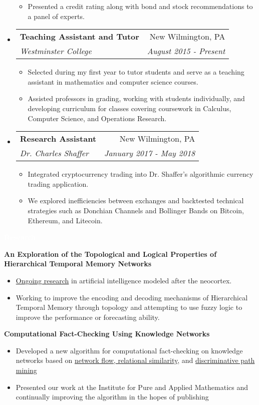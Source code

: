 \documentclass[letterpaper,11pt]{article}
\makeatletter
\newcommand{\resitem}[1]{\item #1 \vspace{-2pt}}
\newcommand{\resheading}[1]{{\large \colorbox{mypurple}{\begin{minipage}{\textwidth}{\textbf{#1 \vphantom{p\^{E}}}}\end{minipage}}}}
\newcommand{\ressubheading}[4]{
	\begin{tabular*}{7.0in}{l@{\extracolsep{\fill}}r}
		\textbf{#1} & #2 \\
		\textit{#3} & \textit{#4} \\
	\end{tabular*}\vspace{-6pt}}
\makeatother
\begin{document}
\begin{itemize}
\begin{itemize}
			\resitem{Presented a credit rating along with bond and stock recommendations to a panel of experts.}
		\end{itemize}	
	\item
		\ressubheading{Teaching Assistant and Tutor}{New Wilmington, PA}{Westminster College}{August 2015 - Present}
		\begin{itemize}
			\resitem{Selected during my first year to tutor students and serve as a teaching assistant in mathematics and computer science courses.}
			\resitem{Assisted professors in grading, working with students individually, and developing curriculum for classes covering coursework in Calculus, Computer Science, and Operations Research.}
		\end{itemize}
		
		\item
		\ressubheading{Research Assistant}{New Wilmington, PA}{Dr. Charles Shaffer}{January 2017 - May 2018}
		\begin{itemize}
			\resitem{Integrated cryptocurrency trading into Dr. Shaffer's algorithmic currency trading application.}
			\resitem{We explored inefficiencies between exchanges and backtested technical strategies such as Donchian Channels and Bollinger Bands on Bitcoin, Ethereum, and Litecoin.}
		\end{itemize}
		
		\pagebreak
		
	\end{itemize}
	
	\resheading{\textcolor{white}{Research}}
	
		\vspace{0.1in}

		\textbf{An Exploration of the Topological and Logical Properties of Hierarchical Temporal Memory Networks}
		\begin{itemize}
			\resitem{\href{https://github.com/alexandermichels/HonorsResearch}{Ongoing research} in artificial intelligence modeled after the neocortex.}
			\resitem{Working to improve the encoding and decoding mechanisms of Hierarchical Temporal Memory through topology and attempting to use fuzzy logic to improve the performance or forecasting ability.}
		\end{itemize}
		
		\textbf{Computational Fact-Checking Using Knowledge Networks}
		\begin{itemize}
			\resitem{Developed a new algorithm for computational fact-checking on knowledge networks based on \href{https://arxiv.org/pdf/1708.07239.pdf}{network flow, relational similarity,} and \href{https://arxiv.org/pdf/1510.05911.pdf}{discriminative path mining} }
			\resitem{Presented our work at the Institute for Pure and Applied Mathematics and continually improving the algorithm in the hopes of publishing}
		\end{itemize}
		
\end{document}
